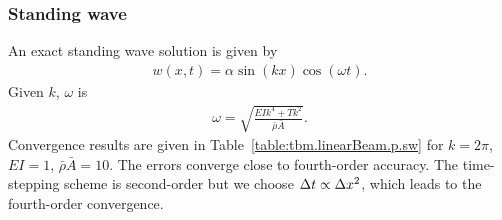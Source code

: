 \documentclass[11pt]{article}
\newcommand{\dt}{{\Delta t}}
\newcommand{\rhos}{\bar{\rho}}
\newcommand{\As}{\bar{A}}
\begin{document}
{



}


\clearpage
\subsubsection{Standing wave} 

An exact standing wave solution is given by
\begin{align*}
   w(x,t) = \alpha \sin(k x)\cos(\omega t) .
\end{align*}
Given $k$, $\omega$ is 
\begin{align*}
   \omega =\sqrt{ \frac{E I k^4 + T k^2}{\rhos\As} } .
\end{align*}
Convergence results are given in Table~\ref{table:tbm.linearBeam.p.sw} for $k=2\pi$, $E I=1$, $\rhos\As=10$.
The errors converge close to fourth-order accuracy. The time-stepping scheme is second-order but 
we choose $\dt \propto \dx^2$, which leads to the fourth-order convergence.





%
%
\end{document}
